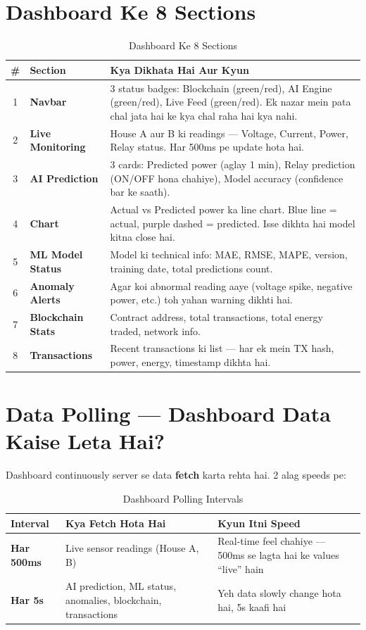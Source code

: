 \section{Dashboard Ke 8 Sections}

\begin{table}[H]
\centering
\begin{tabularx}{\textwidth}{c l X}
\toprule
\textbf{\#} & \textbf{Section} & \textbf{Kya Dikhata Hai Aur Kyun} \\
\midrule
1 & \textbf{Navbar} & 3 status badges: Blockchain (green/red), AI Engine (green/red), Live Feed (green/red). Ek nazar mein pata chal jata hai ke kya chal raha hai kya nahi. \\
2 & \textbf{Live Monitoring} & House A aur B ki readings --- Voltage, Current, Power, Relay status. Har 500ms pe update hota hai. \\
3 & \textbf{AI Prediction} & 3 cards: Predicted power (aglay 1 min), Relay prediction (ON/OFF hona chahiye), Model accuracy (confidence bar ke saath). \\
4 & \textbf{Chart} & Actual vs Predicted power ka line chart. Blue line = actual, purple dashed = predicted. Isse dikhta hai model kitna close hai. \\
5 & \textbf{ML Model Status} & Model ki technical info: MAE, RMSE, MAPE, version, training date, total predictions count. \\
6 & \textbf{Anomaly Alerts} & Agar koi abnormal reading aaye (voltage spike, negative power, etc.) toh yahan warning dikhti hai. \\
7 & \textbf{Blockchain Stats} & Contract address, total transactions, total energy traded, network info. \\
8 & \textbf{Transactions} & Recent transactions ki list --- har ek mein TX hash, power, energy, timestamp dikhta hai. \\
\bottomrule
\end{tabularx}
\caption{Dashboard Ke 8 Sections}
\end{table}

\section{Data Polling --- Dashboard Data Kaise Leta Hai?}

Dashboard continuously server se data \textbf{fetch} karta rehta hai. 2 alag speeds pe:

\begin{table}[H]
\centering
\small
\begin{tabularx}{\textwidth}{l l X}
\toprule
\textbf{Interval} & \textbf{Kya Fetch Hota Hai} & \textbf{Kyun Itni Speed} \\
\midrule
\textbf{Har 500ms} & Live sensor readings (House A, B) & Real-time feel chahiye --- 500ms se lagta hai ke values ``live'' hain \\
\textbf{Har 5s} & AI prediction, ML status, anomalies, blockchain, transactions & Yeh data slowly change hota hai, 5s kaafi hai \\
\bottomrule
\end{tabularx}
\caption{Dashboard Polling Intervals}
\end{table}

